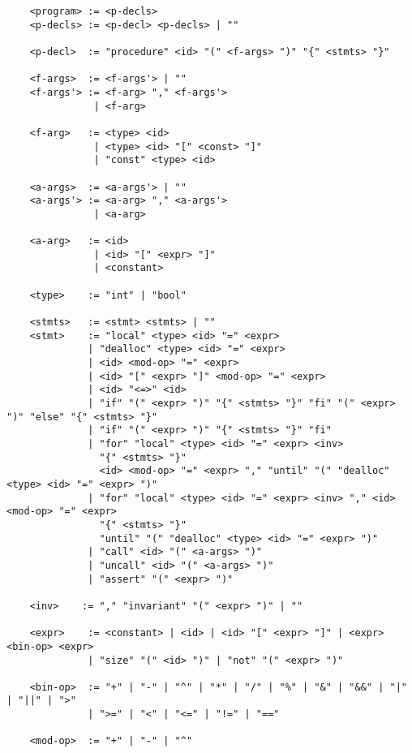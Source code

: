 \begin{verbatim}
    <program> := <p-decls>
    <p-decls> := <p-decl> <p-decls> | ""

    <p-decl>  := "procedure" <id> "(" <f-args> ")" "{" <stmts> "}"

    <f-args>  := <f-args'> | ""
    <f-args'> := <f-arg> "," <f-args'>
               | <f-arg>

    <f-arg>   := <type> <id>
               | <type> <id> "[" <const> "]"
               | "const" <type> <id>

    <a-args>  := <a-args'> | ""
    <a-args'> := <a-arg> "," <a-args'>
               | <a-arg>
    
    <a-arg>   := <id>
               | <id> "[" <expr> "]"
               | <constant>

    <type>    := "int" | "bool"

    <stmts>   := <stmt> <stmts> | ""
    <stmt>    := "local" <type> <id> "=" <expr>
              | "dealloc" <type> <id> "=" <expr>
              | <id> <mod-op> "=" <expr>
              | <id> "[" <expr> "]" <mod-op> "=" <expr>
              | <id> "<=>" <id>
              | "if" "(" <expr> ")" "{" <stmts> "}" "fi" "(" <expr> ")" "else" "{" <stmts> "}"
              | "if" "(" <expr> ")" "{" <stmts> "}" "fi"
              | "for" "local" <type> <id> "=" <expr> <inv>
                "{" <stmts> "}"
                <id> <mod-op> "=" <expr> "," "until" "(" "dealloc" <type> <id> "=" <expr> ")"
              | "for" "local" <type> <id> "=" <expr> <inv> "," <id> <mod-op> "=" <expr>
                "{" <stmts> "}"
                "until" "(" "dealloc" <type> <id> "=" <expr> ")"
              | "call" <id> "(" <a-args> ")"
              | "uncall" <id> "(" <a-args> ")"
              | "assert" "(" <expr> ")"

    <inv>    := "," "invariant" "(" <expr> ")" | ""

    <expr>    := <constant> | <id> | <id> "[" <expr> "]" | <expr> <bin-op> <expr>
              | "size" "(" <id> ")" | "not" "(" <expr> ")"

    <bin-op>  := "+" | "-" | "^" | "*" | "/" | "%" | "&" | "&&" | "|" | "||" | ">"
              | ">=" | "<" | "<=" | "!=" | "=="
    
    <mod-op>  := "+" | "-" | "^"
\end{verbatim}

